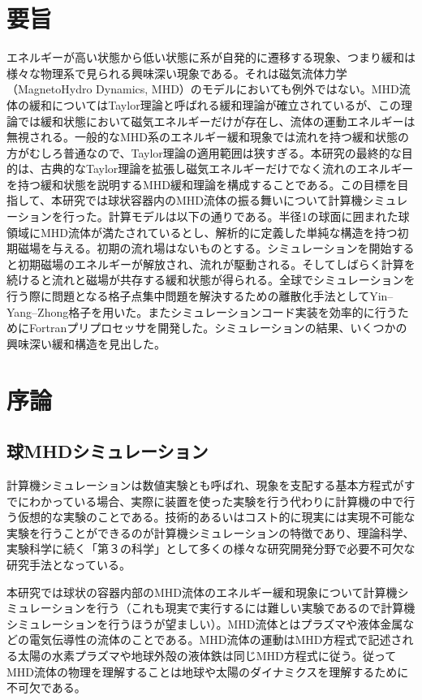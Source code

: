 \documentclass[12pt]{jsarticle}
\begin{document}
\section*{要旨}
エネルギーが高い状態から低い状態に系が自発的に遷移する現象、つまり緩和は様々な物理系で見られる興味深い現象である。それは磁気流体力学（MagnetoHydro Dynamics, MHD）のモデルにおいても例外ではない。MHD流体の緩和についてはTaylor理論と呼ばれる緩和理論が確立されているが、この理論では緩和状態において磁気エネルギーだけが存在し、流体の運動エネルギーは無視される。一般的なMHD系のエネルギー緩和現象では流れを持つ緩和状態の方がむしろ普通なので、Taylor理論の適用範囲は狭すぎる。本研究の最終的な目的は、古典的なTaylor理論を拡張し磁気エネルギーだけでなく流れのエネルギーを持つ緩和状態を説明するMHD緩和理論を構成することである。この目標を目指して、本研究では球状容器内のMHD流体の振る舞いについて計算機シミュレーションを行った。計算モデルは以下の通りである。半径1の球面に囲まれた球領域にMHD流体が満たされているとし、解析的に定義した単純な構造を持つ初期磁場を与える。初期の流れ場はないものとする。シミュレーションを開始すると初期磁場のエネルギーが解放され、流れが駆動される。そしてしばらく計算を続けると流れと磁場が共存する緩和状態が得られる。全球でシミュレーションを行う際に問題となる格子点集中問題を解決するための離散化手法としてYin--Yang--Zhong格子を用いた。またシミュレーションコード実装を効率的に行うためにFortranプリプロセッサを開発した。シミュレーションの結果、いくつかの興味深い緩和構造を見出した。


\newpage
\thispagestyle{empty}
\setcounter{tocdepth}{2}
\tableofcontents
\newpage
\setcounter{page}{1}
\section{序論}
\subsection{球MHDシミュレーション}
計算機シミュレーションは数値実験とも呼ばれ、現象を支配する基本方程式がすでにわかっている場合、実際に装置を使った実験を行う代わりに計算機の中で行う仮想的な実験のことである。技術的あるいはコスト的に現実には実現不可能な実験を行うことができるのが計算機シミュレーションの特徴であり、理論科学、実験科学に続く「第３の科学」として多くの様々な研究開発分野で必要不可欠な研究手法となっている\cite{プラズマシミュレーション}。

本研究では球状の容器内部のMHD流体のエネルギー緩和現象について計算機シミュレーションを行う（これも現実で実行するには難しい実験であるので計算機シミュレーションを行うほうが望ましい）。MHD流体とはプラズマや液体金属などの電気伝導性の流体のことである。MHD流体の運動はMHD方程式で記述される太陽の水素プラズマや地球外殻の液体鉄\cite{地球ダイナモ研究のこれまでとこれから}は同じMHD方程式に従う。従ってMHD流体の物理を理解することは地球や太陽のダイナミクスを理解するために不可欠である。
\end{document}
